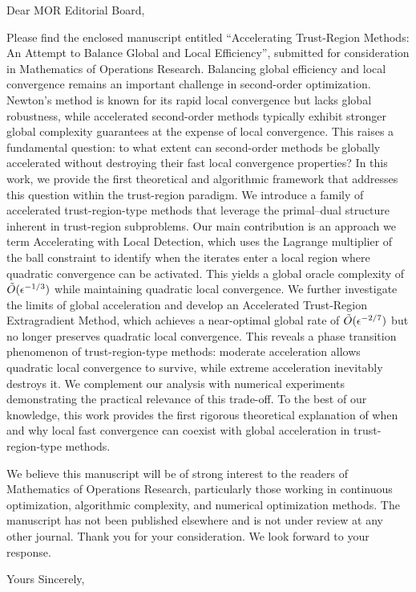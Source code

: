 \documentclass{letter}
\begin{document}
\begin{letter}{}
    \opening{Dear MOR Editorial Board,}

    Please find the enclosed manuscript entitled “Accelerating Trust-Region Methods: An Attempt to Balance Global and Local Efficiency”, submitted for consideration in Mathematics of Operations Research.
Balancing global efficiency and local convergence remains an important challenge in second-order optimization. Newton’s method is known for its rapid local convergence but lacks global robustness, while accelerated second-order methods typically exhibit stronger global complexity guarantees at the expense of local convergence. This raises a fundamental question: to what extent can second-order methods be globally accelerated without destroying their fast local convergence properties?
In this work, we provide the first theoretical and algorithmic framework that addresses this question within the trust-region paradigm. We introduce a family of accelerated trust-region-type methods that leverage the primal–dual structure inherent in trust-region subproblems. Our main contribution is an approach we term Accelerating with Local Detection, which uses the Lagrange multiplier of the ball constraint to identify when the iterates enter a local region where quadratic convergence can be activated. This yields a global oracle complexity of $\Tilde{O}(\epsilon^{-1/3})$ while maintaining quadratic local convergence.
We further investigate the limits of global acceleration and develop an Accelerated Trust-Region Extragradient Method, which achieves a near-optimal global rate of $\Tilde{O}(\epsilon^{-2/7})$ but no longer preserves quadratic local convergence. This reveals a phase transition phenomenon of trust-region-type methods: moderate acceleration allows quadratic local convergence to survive, while extreme acceleration inevitably destroys it. We complement our analysis with numerical experiments demonstrating the practical relevance of this trade-off.
To the best of our knowledge, this work provides the first rigorous theoretical explanation of when and why local fast convergence can coexist with global acceleration in trust-region-type methods.

We believe this manuscript will be of strong interest to the readers of Mathematics of Operations Research, particularly those working in continuous optimization, algorithmic complexity, and numerical optimization methods. The manuscript has not been published elsewhere and is not under review at any other journal.
Thank you for your consideration. We look forward to your response.


    \closing{Yours Sincerely,}

\end{letter}
\end{document}
